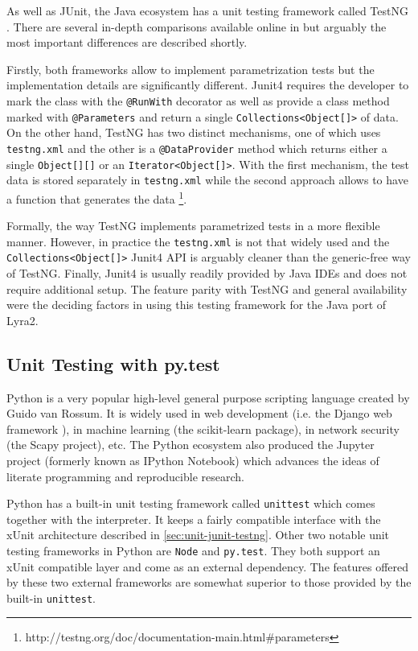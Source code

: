 As well as JUnit, the Java ecosystem has a unit testing framework called TestNG \cite{testng:2017:home}. There are several in-depth comparisons available online in \cite{mkyong:2017:testng-vs-junit, wiki:2017:testng-vs-junit} but arguably the most important differences are described shortly.

Firstly, both frameworks allow to implement parametrization tests but the implementation details are significantly different. Junit4 requires the developer to mark the class with the \texttt{@RunWith} decorator as well as provide a class method marked with \texttt{@Parameters} and return a single \texttt{Collections<Object[]>} of data. On the other hand, TestNG has two distinct mechanisms, one of which uses \texttt{testng.xml} and the other is a \texttt{@DataProvider} method which returns either a single \texttt{Object[][]} or an \texttt{Iterator<Object[]>}. With the first mechanism, the test data is stored separately in \texttt{testng.xml} while the second approach allows to have a function that generates the data \footnote{http://testng.org/doc/documentation-main.html\#parameters}.

Formally, the way TestNG implements parametrized tests in a more flexible manner. However, in practice the \texttt{testng.xml} is not that widely used and the \texttt{Collections<Object[]>} Junit4 API is arguably cleaner than the generic-free way of TestNG. Finally, Junit4 is usually readily provided by Java IDEs and does not require additional setup. The feature parity with TestNG and general availability were the deciding factors in using this testing framework for the Java port of Lyra2.

\subsection{Unit Testing with py.test}
\label{sec:unit-pytest}

Python is a very popular high-level general purpose scripting language created by Guido van Rossum. It is widely used in web development (i.e. the Django web framework \cite{django:2017:homepage}), in machine learning (the scikit-learn package), in network security (the Scapy project), etc. The Python ecosystem also produced the Jupyter project (formerly known as IPython Notebook) which advances the ideas of literate programming and reproducible research.

Python has a built-in unit testing framework called \texttt{unittest} which comes together with the interpreter. It keeps a fairly compatible interface with the xUnit architecture described in \ref{sec:unit-junit-testng}. Other two notable unit testing frameworks in Python are \texttt{Node} and \texttt{py.test}. They both support an xUnit compatible layer and come as an external dependency. The features offered by these two external frameworks are somewhat superior to those provided by the built-in \texttt{unittest}.

